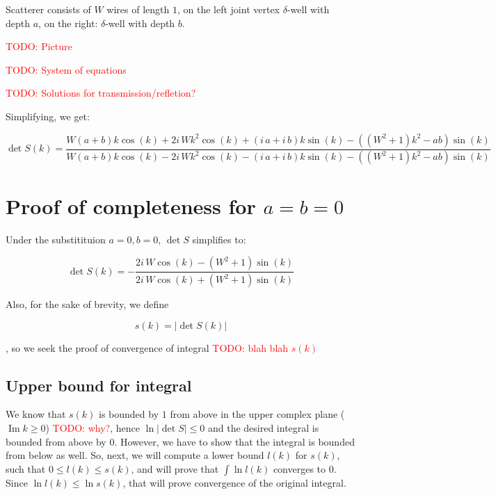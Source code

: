 \documentclass[12pt, a4paper]{article}
\newcommand{\abs}[1]{\left| #1 \right|}
\renewcommand{\Im}{\operatorname{Im}}
\newcommand{\todo}[1]{{\large \textcolor{red}{TODO: #1}}}
\begin{document}
Scatterer consists of $W$ wires of length $1$, on the left joint vertex $\delta$-well with depth $a$, on the right: $\delta$-well with depth $b$. 

\todo{Picture}

\todo{System of equations}

\todo{Solutions for transmission/refletion?}

Simplifying, we get:

\[
\det S(k) = \frac{W {\left(a + b\right)} k \cos\left(k\right) + 2 i \, W k^{2} \cos\left(k\right) + {\left(i \, a + i \, b\right)} k \sin\left(k\right) - {\left({\left(W^{2} + 1\right)} k^{2} - a b\right)} \sin\left(k\right)}{W {\left(a + b\right)} k \cos\left(k\right) - 2 i \, W k^{2} \cos\left(k\right) - {\left(i \, a + i \, b\right)} k \sin\left(k\right) - {\left({\left(W^{2} + 1\right)} k^{2} - a b\right)} \sin\left(k\right)}
\]



\section*{Proof of completeness for $a = b = 0$}
Under the substitituion $a = 0, b = 0$, $\det S$ simplifies to:

\[
\det S(k) = - \frac{2 i \, W \cos\left(k\right) - {\left(W^{2} + 1\right)} \sin\left(k\right)}{2 i \, W \cos\left(k\right) + {\left(W^{2} + 1\right)} \sin\left(k\right)}
\]

Also, for the sake of brevity, we define 

\[
s(k) = \abs{\det S(k)}
\]

, so we seek the proof of convergence of integral \todo{blah blah $s(k)$}






\subsection{Upper bound for integral}

We know that $s(k)$ is bounded by $1$ from above in the upper complex plane  ($\Im k \ge 0$) \todo{why?}, hence $\ln \abs{\det S} \le 0$ and the desired integral is bounded from above by $0$. However, we have to show that the integral is bounded from below as well. So, next, we will compute a lower bound $l(k)$ for $s(k)$, such that $0 \le l(k) \le s(k)$, and will prove that $\int \ln l(k)$ converges to $0$. Since $\ln l(k) \le \ln s(k)$, that will prove convergence of the original integral.
\end{document}
